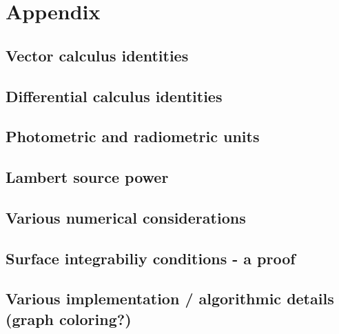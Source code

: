 \chapter{Appendix}
\label{ch:appendix}

\section{Vector calculus identities}

\section{Differential calculus identities}

\section{Photometric and radiometric units}

\section{Lambert source power}

\section{Various numerical considerations}

\section{Surface integrabiliy conditions - a proof}

\section{Various implementation / algorithmic details  (graph coloring?)}
